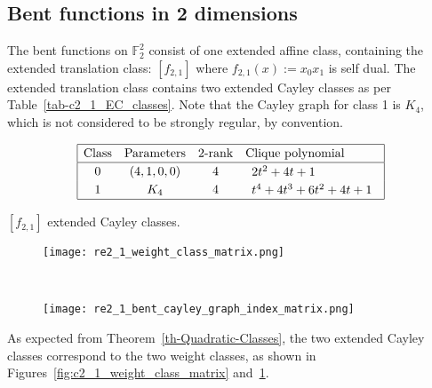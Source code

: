 \documentclass[12pt,a4paper]{article}
\newcommand{\mb}[1]{\mathbb{#1}}
\newcommand{\F}{\mb{F}}
\begin{document}
\subsection{Bent functions in 2 dimensions}
%
The bent functions on $\F_2^2$ consist of one extended affine class, containing the extended translation class: $[f_{2,1}]$
where $f_{2,1}(x) := x_0 x_1$ is self dual.
The extended translation class contains two extended Cayley classes as per Table~\ref{tab-c2_1_EC_classes}.
Note that the Cayley graph for class 1 is $K_4$, which is not considered to be strongly regular, by convention.
\begin{table}[!bhpt] %
\small{
\begin{align*}
\def\arraystretch{1.2}
\begin{array}{|cccl|}
\hline
\text{Class} &
\text{Parameters} &
\text{2-rank} &
\text{Clique polynomial}
\\
\hline
0 &
(4, 1, 0, 0) &
4 &
\begin{array}{l}
2t^{2} + 4t + 1
\end{array}
\\
1 &
K_4 &
4 &
\begin{array}{l}
t^{4} + 4t^{3} + 6t^{2} + 4t + 1
\end{array}
\\
\hline
\end{array}
\end{align*}
}
\caption{$[f_{2,1}]$ extended Cayley classes.}
\label{tab-c2_1_EC_classes}
\end{table}

\begin{figure}[!ht]
\centering
\begin{minipage}{.48\textwidth}
  \centering
  \texttt{[image: re2\_1\_weight\_class\_matrix.png]}
  \label{fig:c2_1_weight_class_matrix}
\end{minipage}%
~~~~
\begin{minipage}{.48\textwidth}
  \centering
  \texttt{[image: re2\_1\_bent\_cayley\_graph\_index\_matrix.png]}
  \label{fig:c2_1_bent_cayley_graph_index_matrix}
\end{minipage}
\end{figure}
As expected from Theorem~\ref{th-Quadratic-Classes},
the two extended Cayley classes correspond to the two weight classes,
as shown in Figures~\ref{fig:c2_1_weight_class_matrix} and~\ref{fig:c2_1_bent_cayley_graph_index_matrix}.
\end{document}
